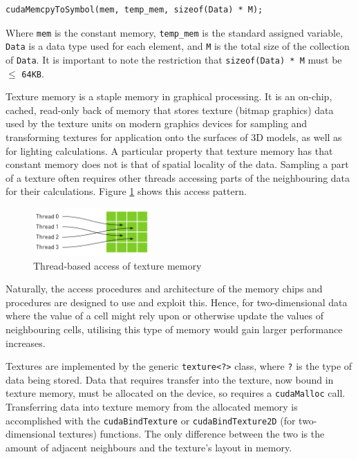 \documentclass[conference]{IEEEtran}
\begin{document}
\begin{lstlisting}[breaklines]
    cudaMemcpyToSymbol(mem, temp_mem, sizeof(Data) * M);
\end{lstlisting}

Where \texttt{mem} is the constant memory, \texttt{temp\_mem} is the standard assigned variable, \texttt{Data} is a data type used for each element, and \texttt{M} is the total size of the collection of \texttt{Data}. It is important to note the restriction that \texttt{sizeof(Data) * M} must be $\leq$ \texttt{64KB}.

Texture memory is a staple memory in graphical processing. It is an on-chip, cached, read-only back of memory that stores texture (bitmap graphics) data used by the texture units on modern graphics devices for sampling and transforming textures for application onto the surfaces of 3D models, as well as for lighting calculations. A particular property that texture memory has that constant memory does not is that of spatial locality of the data. Sampling a part of a texture often requires other threads accessing parts of the neighbouring data for their calculations. Figure \ref{fig:texmem} shows this access pattern.

\begin{figure}[H]
    \centering
    \includegraphics[width=0.4\textwidth]{images/TextureMemory.png}
    \caption{Thread-based access of texture memory}
    \label{fig:texmem}
\end{figure}

Naturally, the access procedures and architecture of the memory chips and procedures are designed to use and exploit this. Hence, for two-dimensional data where the value of a cell might rely upon or otherwise update the values of neighbouring cells, utilising this type of memory would gain larger performance increases.

Textures are implemented by the generic \texttt{texture<?>} class, where \texttt{?} is the type of data being stored. Data that requires transfer into the texture, now bound in texture memory, must be allocated on the device, so requires a \texttt{cudaMalloc} call. Transferring data into texture memory from the allocated memory is accomplished with the \texttt{cudaBindTexture} or \texttt{cudaBindTexture2D} (for two-dimensional textures) functions. The only difference between the two is the amount of adjacent neighbours and the texture's layout in memory\cite{wilt2013cuda}.
\end{document}
